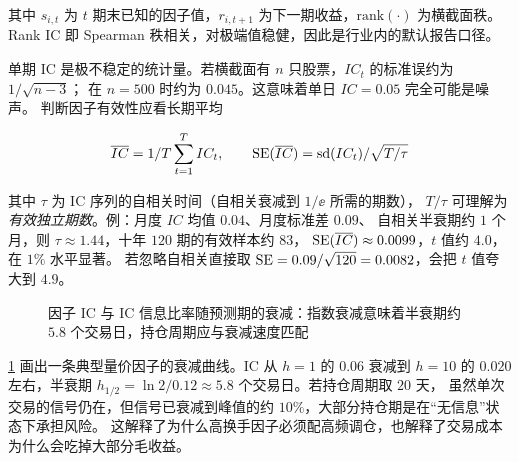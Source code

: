其中 $s_{i,t}$ 为 $t$ 期末已知的因子值，$r_{i,t+1}$ 为下一期收益，$\mathrm{rank}(\cdot)$ 为横截面秩。
Rank IC 即 Spearman 秩相关，对极端值稳健，因此是行业内的默认报告口径。

单期 IC 是极不稳定的统计量。若横截面有 $n$ 只股票，$IC_t$ 的标准误约为 $1/\sqrt{n-3}$；
在 $n=500$ 时约为 $0.045$。这意味着单日 $IC=0.05$ 完全可能是噪声。
判断因子有效性应看长期平均

\begin{equation}
  \overline{IC} = 1/T\sum_{t=1}^{T} IC_t, \qquad
  \operatorname{SE}(\overline{IC}) = \operatorname{sd}(IC_t)/\sqrt{T/\tau}
  \label{eq:07-icse}
\end{equation}

其中 $\tau$ 为 IC 序列的自相关时间（自相关衰减到 $1/\ee$ 所需的期数），
$T/\tau$ 可理解为\emph{有效独立期数}。例：月度 $IC$ 均值 $0.04$、月度标准差 $0.09$、
自相关半衰期约 $1$ 个月，则 $\tau \approx 1.44$，十年 $120$ 期的有效样本约 $83$，
$\operatorname{SE}(\overline{IC}) \approx 0.0099$，$t$ 值约 $4.0$，在 $1\%$ 水平显著。
若忽略自相关直接取 $\operatorname{SE} = 0.09/\sqrt{120} = 0.0082$，会把 $t$ 值夸大到 $4.9$。

\begin{figure}[htbp]
\centering
{}
\caption{因子 IC 与 IC 信息比率随预测期的衰减：指数衰减意味着半衰期约 $5.8$ 个交易日，持仓周期应与衰减速度匹配}\label{fig:07-icdecay}
\end{figure}

\cref{fig:07-icdecay} 画出一条典型量价因子的衰减曲线。IC 从 $h=1$ 的 $0.06$ 衰减到 $h=10$ 的
$0.020$ 左右，半衰期 $h_{1/2} = \ln 2/0.12 \approx 5.8$ 个交易日。若持仓周期取 $20$ 天，
虽然单次交易的信号仍在，但信号已衰减到峰值的约 $10\%$，大部分持仓期是在“无信息”状态下承担风险。
这解释了为什么高换手因子必须配高频调仓，也解释了交易成本为什么会吃掉大部分毛收益。

